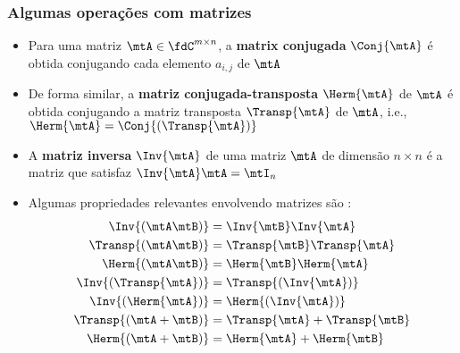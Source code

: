 \begin{frame}
  \frametitle{Algumas operações com matrizes}
  \begin{itemize}
    \item Para uma matriz $\mtA \in \fdC^{m\times n}$, a \textbf{\alert{matrix conjugada}} $\Conj{\mtA}$ é obtida conjugando cada elemento $a_{i,j}$ de $\mtA$
    \item De forma similar, a \textbf{\alert{matriz conjugada-transposta}} $\Herm{\mtA}$ de $\mtA$ é obtida conjugando a matriz transposta $\Transp{\mtA}$  de $\mtA$, i.e., $\Herm{\mtA} = \Conj{\left(\Transp{\mtA}\right)}$
    \item A \textbf{\alert{matriz inversa}} $\Inv{\mtA}$ de uma matriz $\mtA$ de dimensão $n\times n$ é a matriz que satisfaz $\Inv{\mtA}\mtA = \mtI_n$
    \item Algumas propriedades relevantes envolvendo matrizes são \cite{Petersen2008}:
    {\footnotesize\begin{subequations}
      \begin{align}
        \Inv{(\mtA\mtB)} &= \Inv{\mtB}\Inv{\mtA} \\
        \Transp{(\mtA\mtB)} &= \Transp{\mtB}\Transp{\mtA} \\
        \Herm{(\mtA\mtB)} &= \Herm{\mtB}\Herm{\mtA} \\
        \Inv{\left(\Transp{\mtA}\right)} &= \Transp{\left(\Inv{\mtA}\right)} \\
        \Inv{\left(\Herm{\mtA}\right)} &= \Herm{\left(\Inv{\mtA}\right)} \\
        \Transp{(\mtA+\mtB)} &= \Transp{\mtA} + \Transp{\mtB} \\
        \Herm{(\mtA+\mtB)} &= \Herm{\mtA} + \Herm{\mtB}
      \end{align}
    \end{subequations}}
  \end{itemize}
\end{frame}

